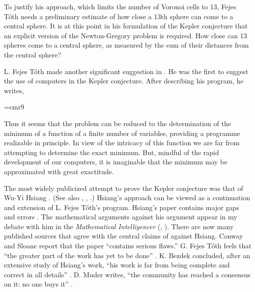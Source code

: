To justify his approach, which limits the number of Voronoi cells
to 13, Fejes T\'oth needs a preliminary estimate of how close
a 13th sphere can come to a central sphere.  It is at this point
in his formulation of the Kepler conjecture that an explicit
version of the Newton-Gregory problem is required.  How
close can 13 spheres come to a central sphere, as measured by
the sum of their distances from the central sphere?


L. Fejes T\'oth made another significant suggestion in \cite{Fej64}.
He was the first to suggest the use of computers in the Kepler conjecture.
After describing his program, he writes,

{
\narrower
\font\ninerm=cmr9
\ninerm

Thus it seems that the problem can be reduced to the determination
of the minimum of a function of a finite number of variables,
providing a programme realizable in principle.  In view of the
intricacy of this function we are far from attempting to
determine the exact minimum.  But, mindful of the rapid development
of our computers, it is imaginable that the minimum may
be approximated with great exactitude.

}

\smallskip
The most widely publicized attempt to prove the Kepler conjecture
was that of Wu-Yi Hsiang \cite{Hsi93}.  (See also \cite{Hsi93a},
\cite{Hsi93b}, \cite{Hsi02}.)  Hsiang's approach can be viewed as
a continuation and extension of L. Fejes T\'oth's program.
Hsiang's paper contains major gaps and errors \cite{CoHMS94}.
  The mathematical arguments against his argument appear
in my
debate with him in the {\it Mathematical Intelligencer}
(\cite{Hal94}, \cite{Hsi95}).
There are now many published sources that agree with the central
claims of \cite{Hal94} against Hsiang.
Conway and Sloane report that the paper ``contains serious flaws.''
G. Fejes T\'oth feels that ``the greater part of the work has yet
to be done'' \cite{Fej95}.   K. Bezdek concluded,
after an extensive study of Hsiang's work, ``his work is far from being
complete and correct in all details'' \cite{Bez97}.
 D. Muder writes, ``the
community has reached a consensus on it: no one buys it'' \cite{Mud97}.


